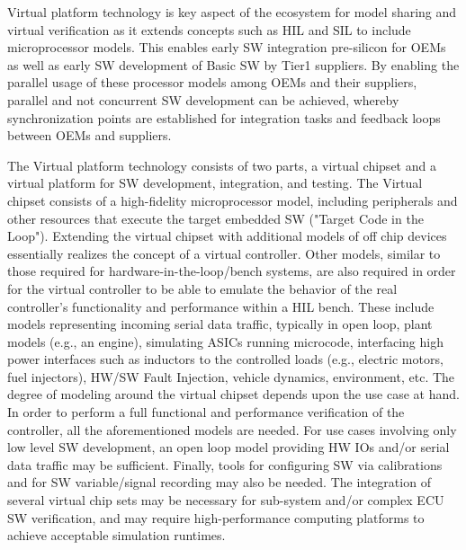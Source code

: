 Virtual platform technology is key aspect of the ecosystem for model sharing and virtual verification as it extends concepts such as HIL and SIL to include microprocessor models. This enables early SW integration pre-silicon for OEMs as well as early SW development of Basic SW by Tier1 suppliers. By enabling the parallel usage of these processor models among OEMs and their suppliers, parallel and not concurrent SW development can be achieved, whereby synchronization points are established for integration tasks and feedback loops between OEMs and suppliers.

The Virtual platform technology consists of two parts, a virtual chipset and a virtual platform for SW development, integration, and testing.
The Virtual chipset consists of a high-fidelity microprocessor model, including peripherals and other resources that execute the target embedded SW ("Target Code in the Loop").
Extending the virtual chipset with additional models of off chip devices essentially realizes the concept of a virtual controller.
Other models, similar to those required for hardware-in-the-loop/bench systems, are also required in order for the virtual controller to be able to emulate the behavior of the real controller's functionality and performance within a HIL bench.
These include models representing incoming serial data traffic, typically in open loop,
plant models (e.g., an engine), simulating ASICs running microcode, interfacing high power interfaces such as inductors to the controlled loads (e.g., electric motors, fuel injectors), HW/SW Fault Injection, vehicle dynamics, environment, etc.
The degree of modeling around the virtual chipset depends upon the use case at hand.
In order to perform a full functional and performance verification of the controller, all the aforementioned models are needed.
For use cases involving only low level SW development, an open loop model providing HW IOs and/or serial data traffic may be sufficient.
Finally, tools for configuring SW via calibrations and for SW variable/signal recording may also be needed. The integration of several virtual chip sets may be necessary for sub-system and/or complex ECU SW verification, and may require high-performance computing platforms to achieve acceptable simulation runtimes.
